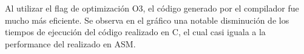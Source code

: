 \documentclass[a4paper]{article}
\begin{document}
\begin{figure}[!ht]
    \centering
    \begin{floatrow}
    \end{floatrow}
\end{figure}

Al utilizar el flag de optimización O3, el código generado por el compilador fue mucho más eficiente. Se observa en el gráfico una notable disminución de los tiempos de ejecución del código realizado en C, el cual casi iguala a la performance del realizado en ASM.

\begin{figure}[!ht]
    \centering
    \begin{floatrow}
    \end{floatrow}
\end{figure}
\end{document}
